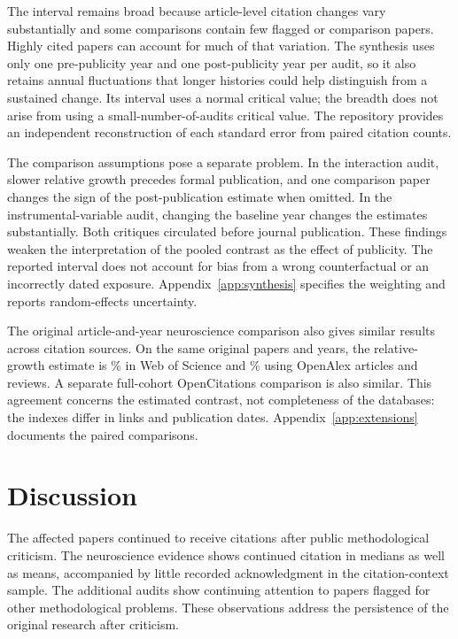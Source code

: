 \documentclass[11pt,letterpaper]{article}
\begin{document}
The interval remains broad because article-level citation changes vary substantially and some comparisons contain few flagged or comparison papers. Highly cited papers can account for much of that variation. The synthesis uses only one pre-publicity year and one post-publicity year per audit, so it also retains annual fluctuations that longer histories could help distinguish from a sustained change. Its interval uses a normal critical value; the breadth does not arise from using a small-number-of-audits critical value. The repository provides an independent reconstruction of each standard error from paired citation counts.

The comparison assumptions pose a separate problem. In the interaction audit, slower relative growth precedes formal publication, and one comparison paper changes the sign of the post-publication estimate when omitted. In the instrumental-variable audit, changing the baseline year changes the estimates substantially. Both critiques circulated before journal publication. These findings weaken the interpretation of the pooled contrast as the effect of publicity. The reported interval does not account for bias from a wrong counterfactual or an incorrectly dated exposure. Appendix~\ref{app:synthesis} specifies the weighting and reports random-effects uncertainty.

The original article-and-year neuroscience comparison also gives similar results across citation sources. On the same original papers and years, the relative-growth estimate is \NwOaWosPercent\% in Web of Science and \NwOaPercent\% using OpenAlex articles and reviews. A separate full-cohort OpenCitations comparison is also similar. This agreement concerns the estimated contrast, not completeness of the databases: the indexes differ in links and publication dates. Appendix~\ref{app:extensions} documents the paired comparisons.

\section{Discussion}
The affected papers continued to receive citations after public methodological criticism. The neuroscience evidence shows continued citation in medians as well as means, accompanied by little recorded acknowledgment in the citation-context sample. The additional audits show continuing attention to papers flagged for other methodological problems. These observations address the persistence of the original research after criticism.
\end{document}
